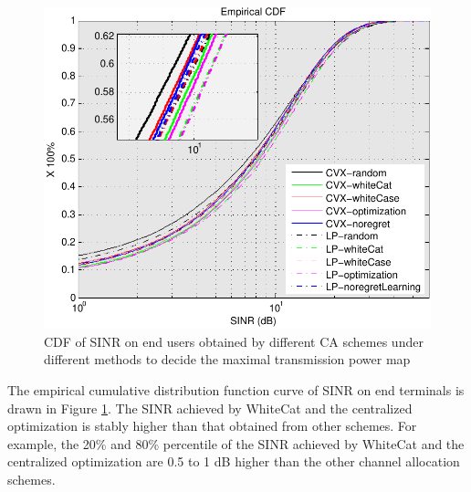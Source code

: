 \documentclass[times]{ettauth}
\theoremstyle{mytheoremstyle}
\theoremstyle{mytheoremstyle}
\theoremstyle{mytheoremstyle}
\begin{document}
  \begin{figure}[h!]
     \centering
     \includegraphics[width=0.7\linewidth]{6000_sinr_cdf.pdf}
     \caption{CDF of SINR on end users obtained by different CA schemes under different methods to decide the maximal transmission power map}
     \label{6000_sinr_cdf}
  \end{figure}

The empirical cumulative distribution function curve of SINR on end terminals is drawn in Figure \ref{6000_sinr_cdf}.
The SINR achieved by WhiteCat and the centralized optimization is stably higher than that obtained from other schemes.
For example, the 20\% and 80\% percentile of the SINR achieved by WhiteCat and the centralized optimization are 0.5 to 1 dB higher than the other channel allocation schemes.
\end{document}
